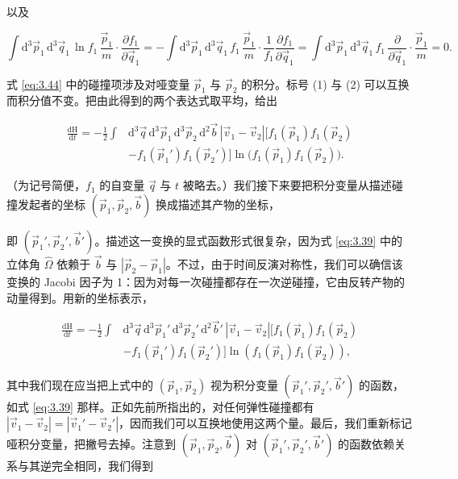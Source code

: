 以及

\begin{equation*}
  \int \mathrm{d}^3\vec p_1\,\mathrm{d}^3\vec q_1\,\ln f_1\,\frac{\vec p_1}{m}\cdot\frac{\partial f_1}{\partial\vec q_1}=-\int \mathrm{d}^3\vec p_1\,\mathrm{d}^3\vec q_1\,f_1\,\frac{\vec p_1}{m}\cdot\frac{1}{f_1}\frac{\partial f_1}{\partial\vec q_1}=\int \mathrm{d}^3\vec p_1\,\mathrm{d}^3\vec q_1\,f_1\,\frac{\partial}{\partial\vec q_1}\cdot\frac{\vec p_1}{m}=0.
\end{equation*}

式 \eqref{eq:3.44} 中的碰撞项涉及对哑变量 $\vec p_1$ 与 $\vec p_2$ 的积分。标号 (1) 与 (2) 可以互换而积分值不变。把由此得到的两个表达式取平均，给出

\begin{equation}\label{eq:3.45}
  \begin{aligned}
    \frac{\mathrm{d}\mathrm{H}}{\mathrm{d}t}=-\frac{1}{2}\int &\mathrm{d}^3\vec q\,\mathrm{d}^3\vec p_1\,\mathrm{d}^3\vec p_2\,\mathrm{d}^2\vec b\,|\vec v_1-\vec v_2|\Big[f_1(\vec p_1)f_1(\vec p_2)\\
    &-f_1(\vec p_1')f_1(\vec p_2')\Big]\ln\big(f_1(\vec p_1)f_1(\vec p_2)\big).
  \end{aligned}
\end{equation}

（为记号简便，$f_1$ 的自变量 $\vec q$ 与 $t$ 被略去。）我们接下来要把积分变量从描述碰撞发起者的坐标 $(\vec p_1,\vec p_2,\vec b)$ 换成描述其产物的坐标，

即 $(\vec p_1',\vec p_2',\vec b')$。描述这一变换的显式函数形式很复杂，因为式 \eqref{eq:3.39} 中的立体角 $\hat\Omega$ 依赖于 $\vec b$ 与 $|\vec p_2-\vec p_1|$。不过，由于时间反演对称性，我们可以确信该变换的 Jacobi 因子为 1：因为对每一次碰撞都存在一次逆碰撞，它由反转产物的动量得到。用新的坐标表示，

\begin{equation}\label{eq:3.46}
  \begin{aligned}
    \frac{\mathrm{d}\mathrm{H}}{\mathrm{d}t}=-\frac{1}{2}\int &\mathrm{d}^3\vec q\,\mathrm{d}^3\vec p_1{}'\,\mathrm{d}^3\vec p_2{}'\,\mathrm{d}^2\vec b'\,|\vec v_1-\vec v_2|\Big[f_1(\vec p_1)f_1(\vec p_2)\\
    &-f_1(\vec p_1{}')f_1(\vec p_2{}')\Big]\ln\left(f_1(\vec p_1)f_1(\vec p_2)\right),
  \end{aligned}
\end{equation}

其中我们现在应当把上式中的 $(\vec p_1,\vec p_2)$ 视为积分变量 $(\vec p_1',\vec p_2',\vec b')$ 的函数，如式 \eqref{eq:3.39} 那样。正如先前所指出的，对任何弹性碰撞都有 $|\vec v_1-\vec v_2|=|\vec v_1'-\vec v_2'|$，因而我们可以互换地使用这两个量。最后，我们重新标记哑积分变量，把撇号去掉。注意到 $(\vec p_1,\vec p_2,\vec b)$ 对 $(\vec p_1',\vec p_2',\vec b')$ 的函数依赖关系与其逆完全相同，我们得到

